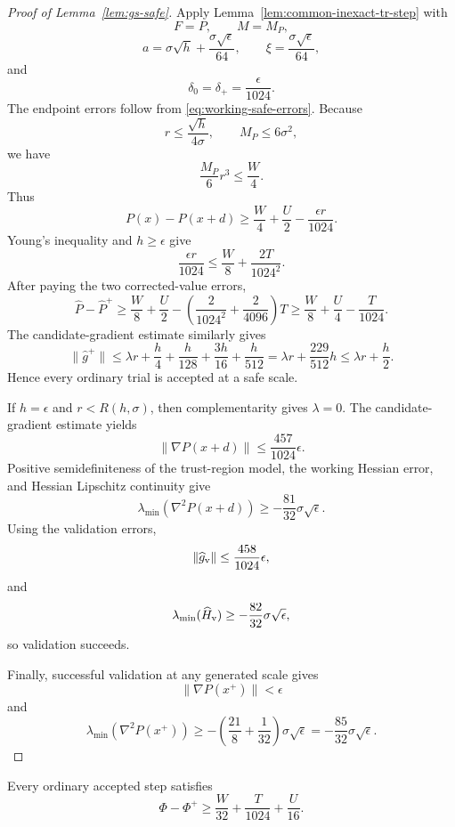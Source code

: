 \begin{proof}[Proof of Lemma~\ref{lem:gs-safe}]
Apply Lemma~\ref{lem:common-inexact-tr-step} with
\[
    F=P,
    \qquad
    M=M_P,
\]
\[
    a
    =
    \sigma\sqrt h
    +
    \frac{\sigma\sqrt\epsilon}{64},
    \qquad
    \xi
    =
    \frac{\sigma\sqrt\epsilon}{64},
\]
and
\[
    \delta_0=\delta_+
    =
    \frac{\epsilon}{1024}.
\]
The endpoint errors follow from
\eqref{eq:working-safe-errors}.
Because
\[
    r\le\frac{\sqrt h}{4\sigma},
    \qquad
    M_P\le6\sigma^2,
\]
we have
\[
    \frac{M_P}{6}r^3
    \le
    \frac W4.
\]
Thus
\[
    P(x)-P(x+d)
    \ge
    \frac W4
    +
    \frac U2
    -
    \frac{\epsilon r}{1024}.
\]
Young's inequality and $h\ge\epsilon$ give
\[
    \frac{\epsilon r}{1024}
    \le
    \frac W8
    +
    \frac{2T}{1024^2}.
\]
After paying the two corrected-value errors,
\[
    \widehat P-\widehat P^+
    \ge
    \frac W8
    +
    \frac U2
    -
    \left(
        \frac2{1024^2}
        +
        \frac2{4096}
    \right)T
    \ge
    \frac W8
    +
    \frac U4
    -
    \frac T{1024}.
\]
The candidate-gradient estimate similarly gives
\[
    \|\widehat g^+\|
    \le
    \lambda r
    +
    \frac h4
    +
    \frac h{128}
    +
    \frac{3h}{16}
    +
    \frac h{512}
    =
    \lambda r+\frac{229}{512}h
    \le
    \lambda r+\frac h2.
\]
Hence every ordinary trial is accepted at a safe scale.

If $h=\epsilon$ and $r<R(h,\sigma)$, then complementarity gives
$\lambda=0$.
The candidate-gradient estimate yields
\[
    \|\nabla P(x+d)\|
    \le
    \frac{457}{1024}\epsilon.
\]
Positive semidefiniteness of the trust-region model, the working
Hessian error, and Hessian Lipschitz continuity give
\[
    \lambda_{\min}
    (\nabla^2P(x+d))
    \ge
    -\frac{81}{32}
    \sigma\sqrt\epsilon.
\]
Using the validation errors,
\[
    \|\widehat g_{\rm v}\|
    \le
    \frac{458}{1024}\epsilon,
\]
and
\[
    \lambda_{\min}(\widehat H_{\rm v})
    \ge
    -\frac{82}{32}
    \sigma\sqrt\epsilon,
\]
so validation succeeds.

Finally, successful validation at any generated scale gives
\[
    \|\nabla P(x^+)\|
    <
    \epsilon
\]
and
\[
    \lambda_{\min}(\nabla^2P(x^+))
    \ge
    -
    \left(
        \frac{21}{8}
        +
        \frac1{32}
    \right)
    \sigma\sqrt\epsilon
    =
    -\frac{85}{32}
    \sigma\sqrt\epsilon.
\]
\end{proof}


\begin{lemma}
\label{lem:gs-descent}
Every ordinary accepted step satisfies
\begin{equation}
    \Phi-\Phi^+
    \ge
    \frac W{32}
    +
    \frac T{1024}
    +
    \frac U{16}.
    \label{eq:gs-potential-decrease-app}
\end{equation}
\end{lemma}

